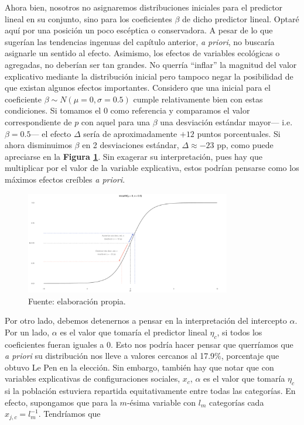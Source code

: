 Ahora bien, nosotros no asignaremos distribuciones iniciales para el predictor lineal en su conjunto, sino para los coeficientes $\beta$ de dicho predictor lineal. Optaré aquí por una posición un poco escéptica o conservadora. A pesar de lo que sugerían las tendencias ingenuas del capítulo anterior, \textit{a priori}, no buscaría asignarle un sentido al efecto. Asimismo, los efectos de variables ecológicas o agregadas, no deberían ser tan grandes. No querría ``inflar'' la magnitud del valor explicativo mediante la distribución inicial pero tampoco negar la posibilidad de que existan algunos efectos importantes. Considero que una inicial para el coeficiente $\beta\sim N(\mu=0,\sigma=0.5)$ cumple relativamente bien con estas condiciones. Si tomamos el $0$ como referencia y comparamos el valor correspondiente de $p$ con aquel para una $\beta$ una desviación estándar mayor--- i.e. $\beta = 0.5$--- el efecto $\Delta$ sería de aproximadamente $+12$ puntos porcentuales. Si ahora disminuimos $\beta$ en 2 desviaciones estándar,  $\Delta \approx -23$ pp, como puede apreciarse en la \textbf{Figura \ref{fig:Inicial_Coef}}. Sin exagerar su interpretación, pues hay que multiplicar por el valor de la variable explicativa, estos podrían pensarse como los máximos efectos creíbles \textit{a priori}. 

\begin{figure}[h]
	\centering
	\includegraphics[width = 0.8\textwidth]{Figs/Modelado/Inicial_N0_un_medio}
	\caption{Fuente: elaboración propia.}
	\label{fig:Inicial_Coef}
\end{figure}

Por otro lado, debemos detenernos a pensar en la interpretación del intercepto $\alpha$. Por un lado, $\alpha$ es el valor que tomaría el predictor lineal $\eta_c$, si todos los coeficientes fueran iguales a $0$. Esto nos podría hacer pensar que querríamos que \textit{a priori} su distribución nos lleve a valores cercanos al  17.9\%, porcentaje que obtuvo Le Pen en la elección. Sin embargo, también hay que notar que con variables explicativas de configuraciones sociales, $x_c$, $\alpha$ es el valor que tomaría $\eta_c$ si la población estuviera repartida equitativamente entre todas las categorías. En efecto, supongamos que para la $m$-ésima variable con $l_m$ categorías cada $x_{j,c}=l_m^{-1}$. Tendríamos que

